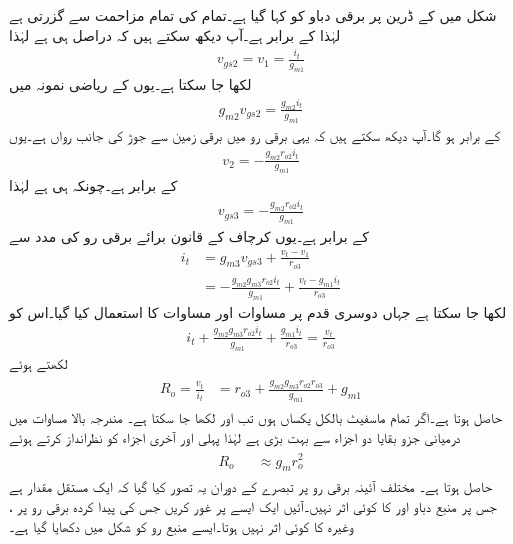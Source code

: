 شکل  میں  کے ڈرین پر برقی دباو کو  کہا گیا ہے۔تمام کی تمام  مزاحمت  سے گزرتی ہے لہٰذا  کے برابر ہے۔آپ دیکھ سکتے ہیں کہ  دراصل  ہی ہے لہٰذا
\begin{align}\label{مساوات_تفرقی_ولسن_پہلا_ماسفیٹ}
v_{gs2}=v_{1}=\frac{i_t}{g_{m1}}
\end{align}
لکھا جا سکتا ہے۔یوں  کے ریاضی نمونہ میں
\begin{align*}
g_{m2} v_{gs2}=\frac{g_{m2} i_t}{g_{m1}}
\end{align*}
کے برابر ہو گا۔آپ دیکھ سکتے ہیں کہ یہی برقی رو  میں برقی زمین سے جوڑ  کی جانب رواں ہے۔یوں
\begin{align*}
v_2=-\frac{g_{m2} r_{o2} i_t}{g_{m1}}
\end{align*}
کے برابر ہے۔چونکہ  ہی ہے لہٰذا
\begin{align}\label{مساوات_تفرقی_ماسفیٹ_ولسن_تیسرا_ماسفیٹ}
v_{gs3}=-\frac{g_{m2} r_{o2} i_t}{g_{m1}}
\end{align}
کے برابر ہے۔یوں کرچاف کے قانون برائے برقی رو کی مدد سے
\begin{align*}
i_t&=g_{m3} v_{gs3}+\frac{v_t-v_1}{r_{o3}}\\
&=-\frac{g_{m2} g_{m3} r_{o2} i_t}{g_{m1}}+\frac{v_t-g_{m1} i_t}{r_{o3}}
\end{align*}
لکھا جا سکتا ہے جہاں دوسری قدم پر مساوات  اور مساوات  کا استعمال کیا گیا۔اس کو
\begin{align*}
i_t+\frac{g_{m2} g_{m3} r_{o2} i_t}{g_{m1}}+\frac{g_{m1} i_t}{r_{o3}}=\frac{v_t}{r_{o3}}
\end{align*}
لکھتے ہوئے
\begin{gather}
\begin{aligned}
R_o=\frac{v_t}{i_t}&=r_{o3}+\frac{g_{m2}g_{m3} r_{o2} r_{o3} }{g_{m1}} +g_{m1}
\end{aligned}
\end{gather}
حاصل ہوتا ہے۔اگر  تمام ماسفیٹ بالکل یکساں ہوں تب  اور  لکھا جا سکتا ہے۔ مندرجہ بالا مساوات میں درمیانی جزو بقایا دو اجزاء سے بہت بڑی ہے لہٰذا  پہلی اور آخری اجزاء کو نظرانداز کرتے ہوئے
\begin{gather}
\begin{aligned}
R_o & & \approx g_m r_o^2
\end{aligned} 
\end{gather}
حاصل ہوتا ہے۔
مختلف آئینہ برقی رو پر تبصرے کے دوران یہ تصور کیا گیا کہ  ایک مستقل مقدار ہے جس پر منبع دباو  اور  کا کوئی اثر نہیں۔آئیں ایک ایسے  پر غور کریں جس کی پیدا کردہ برقی رو پر  ،  وغیرہ کا کوئی اثر نہیں ہوتا۔ایسے  منبع رو کو شکل  میں دکھایا گیا ہے۔

